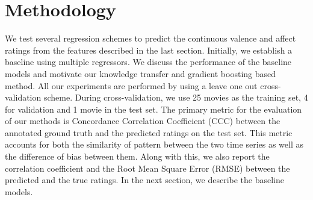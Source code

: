 \documentclass{article}
\begin{document}



\section{Methodology}

We test several regression schemes to predict the continuous valence and affect ratings from the features described in the last section.
Initially, we establish a baseline using multiple regressors.
We discuss the performance of the baseline models and motivate our knowledge transfer and gradient boosting based method.
All our experiments are performed by using a leave one out cross-validation scheme.
During cross-validation, we use 25 movies as the training set, 4 for validation and 1 movie in the test set.
The primary metric for the evaluation of our methods is Concordance Correlation Coefficient (CCC) \cite{} between the annotated ground truth and the predicted ratings on the test set.
This metric accounts for both the similarity of pattern between the two time series as well as the difference of bias between them. 
Along with this, we also report the correlation coefficient and the Root Mean Square Error (RMSE) between the predicted and the true ratings.
In the next section, we describe the baseline models.
\end{document}
